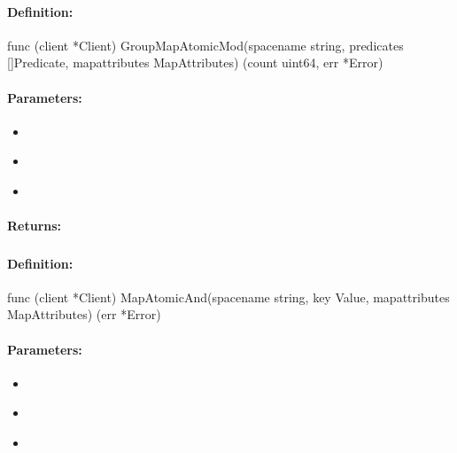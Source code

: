\paragraph{Definition:}
\begin{gocode}
func (client *Client) GroupMapAtomicMod(spacename string, predicates []Predicate, mapattributes MapAttributes) (count uint64, err *Error)
\end{gocode}

\paragraph{Parameters:}
\begin{itemize}[noitemsep]
\item {}\\

\item {}\\

\item {}\\

\end{itemize}

\paragraph{Returns:}


\pagebreak
\subsubsection{}
\label{api:Go:MapAtomicAnd}


\paragraph{Definition:}
\begin{gocode}
func (client *Client) MapAtomicAnd(spacename string, key Value, mapattributes MapAttributes) (err *Error)
\end{gocode}

\paragraph{Parameters:}
\begin{itemize}[noitemsep]
\item {}\\

\item {}\\

\item {}\\

\end{itemize}

